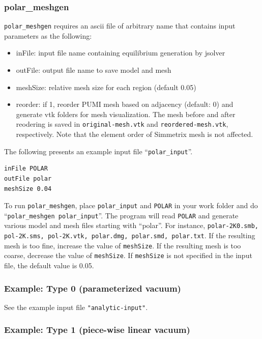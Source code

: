 \subsubsection{polar\_meshgen}
\texttt{polar\_meshgen} requires an ascii file of arbitrary name that contains input parameters as the following:
\begin{itemize}
\item inFile: input file name containing equilibrium generation by jsolver
\item outFile: output file name to save model and mesh
\item meshSize: relative mesh size for each region (default 0.05)
\item reorder: if 1, reorder PUMI mesh based on adjacency (default: 0) and generate vtk folders for mesh visualization. The mesh before and after reodering is saved in \texttt{original-mesh.vtk} and \texttt{reordered-mesh.vtk}, respectively. Note that the element order of Simmetrix mesh is not affected.
\end{itemize}

The following presents an example input file ``\texttt{polar\_input}''.
\begin{verbatim}
inFile POLAR
outFile polar
meshSize 0.04
\end{verbatim}

To run \texttt{polar\_meshgen}, place \texttt{polar\_input} and \texttt{POLAR} in your work folder and do ``\texttt{polar\_meshgen polar\_input}''. The program will read \texttt{POLAR} and generate various model and mesh files starting with ``polar''. For instance, \texttt{polar-2K0.smb, pol-2K.sms, pol-2K.vtk, polar.dmg, polar.smd, polar.txt}. If the resulting mesh is too fine, increase the value of \texttt{meshSize}. If the resulting mesh is too coarse, decrease the value of \texttt{meshSize}. If \texttt{meshSize} is not specified in the input file, the default value is 0.05.   


\subsubsection{Example: Type 0 (parameterized vacuum)}

See the example input file \texttt{"analytic-input"}.


\subsubsection{Example: Type 1 (piece-wise linear vacuum)}

